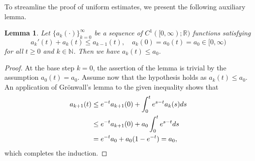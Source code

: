\documentclass{amsart}
\theoremstyle{plain}
\newtheorem{lemma}[theorem]{Lemma}
\theoremstyle{remark}
\numberwithin{equation}{section}
\newcommand{\N}{\mathbb{N}}
\newcommand{\R}{\mathbb{R}}
\newcommand{\ds}{\textnormal{d}s}
\begin{document}
To streamline the proof of uniform estimates, we present the following auxiliary lemma.


\begin{lemma}\label{lem:ind}
Let $\{a_k(\cdot)\}_{k=0}^\infty$ be a sequence of $C^1([0,\infty);\R)$ functions satisfying
\[
a_{k}'(t) +a_{k}(t) \le a_{k-1}(t),\quad a_k(0)=a_0(t) = a_0 \in [0,\infty)
\]
for all $t \ge 0$ and $k \in \N$. Then we have $a_k(t) \le a_0$.
\end{lemma}
\begin{proof}
At the base step $k=0$, the assertion of the lemma is trivial by the assumption $a_0(t) = a_0$. Assume now that the hypothesis holds as $a_k(t) \le a_0$. An application of Gr\"onwall's lemma to the given inequality shows that
\begin{align*}
    a_{k+1}(t) &\le e^{-t} a_{k+1}(0) + \int_0^t e^{s-t} a_k(s) \ds \\
    &\le e^{-t} a_{k+1}(0) + a_0 \int_0^t e^{s-t} \ds \\
    &= e^{-t} a_0 + a_0 (1 - e^{-t}) = a_0,
\end{align*}
which completes the induction.
\end{proof}
\end{document}
